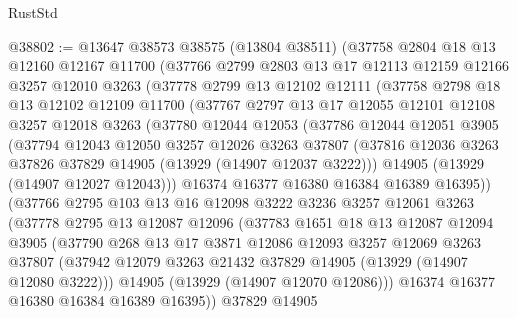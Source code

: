 \begin{lexlean}{RustStd}
\begin{coremodule}
@38802 := @13647
    @38573
    @38575
    (@13804 @38511)
    (@37758
      @2804
      @18
      @13
      @12160
      @12167
      @11700
      (@37766
        @2799
        @2803
        @13
        @17
        @12113
        @12159
        @12166
        @3257
        @12010
        @3263
        (@37778
          @2799
          @13
          @12102
          @12111
          (@37758
            @2798
            @18
            @13
            @12102
            @12109
            @11700
            (@37767
              @2797
              @13
              @17
              @12055
              @12101
              @12108
              @3257
              @12018
              @3263
              (@37780
                @12044
                @12053
                (@37786
                  @12044
                  @12051
                  @3905
                  (@37794
                    @12043
                    @12050
                    @3257
                    @12026
                    @3263
                    @37807
                    (@37816 @12036 @3263 @37826 @37829 @14905 (@13929 (@14907 @12037 @3222)))
                    @14905
                    (@13929 (@14907 @12027 @12043)))
                  @16374
                  @16377
                  @16380
                  @16384
                  @16389
                  @16395))
              (@37766
                @2795
                @103
                @13
                @16
                @12098
                @3222
                @3236
                @3257
                @12061
                @3263
                (@37778
                  @2795
                  @13
                  @12087
                  @12096
                  (@37783
                    @1651
                    @18
                    @13
                    @12087
                    @12094
                    @3905
                    (@37790
                      @268
                      @13
                      @17
                      @3871
                      @12086
                      @12093
                      @3257
                      @12069
                      @3263
                      @37807
                      (@37942 @12079 @3263 @21432 @37829 @14905 (@13929 (@14907 @12080 @3222)))
                      @14905
                      (@13929 (@14907 @12070 @12086)))
                    @16374
                    @16377
                    @16380
                    @16384
                    @16389
                    @16395))
                @37829
                @14905

\end{coremodule}
\end{lexlean}
